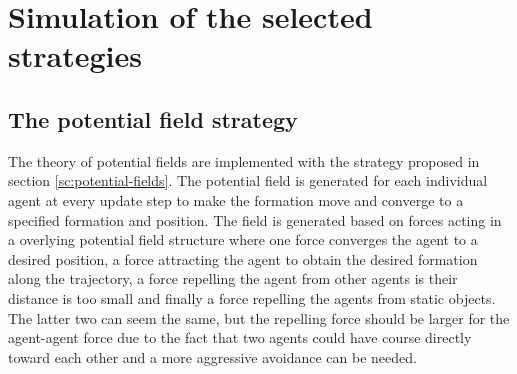 \section{Simulation of the selected strategies}
\label{sc:simofstrat}
\subsection{The potential field strategy}
The theory of potential fields are implemented with the strategy proposed in section \ref{sc:potential-fields}. The potential field is generated for each individual agent at every update step to make the formation move and converge to a specified formation and position. The field is generated based on forces acting in a overlying potential field structure where one force converges the agent to a desired position, a force attracting the agent to obtain the desired formation along the trajectory, a force repelling the agent from other agents is their distance is too small and finally a force repelling the agents from static objects. The latter two can seem the same, but the repelling force should be larger for the agent-agent force due to the fact that two agents could have course directly toward each other and a more aggressive avoidance can be needed.


